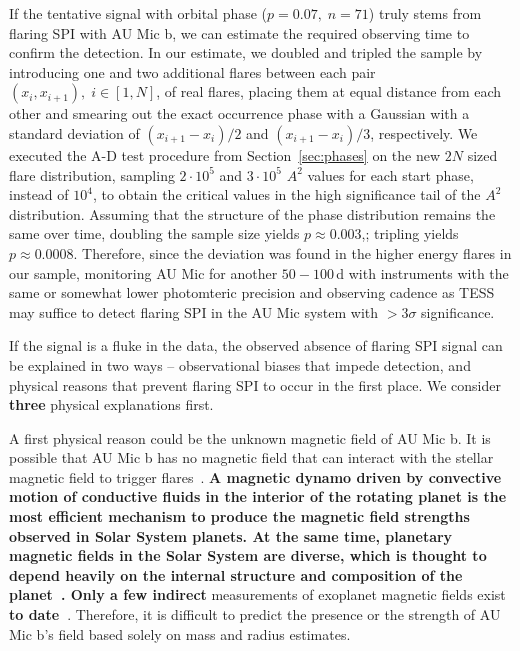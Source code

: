 \documentclass[fleqn,usenatbib]{mnras}%
\begin{document}
If the tentative signal with orbital phase \mbox{($p=0.07,\;n=71$)} truly stems from flaring SPI with AU Mic b, we can estimate the required observing time to confirm the detection. In our estimate, we doubled and tripled the sample by introducing one and two additional flares between each pair $(x_i,x_{i+1}),\;i \in [1,N]$, of real flares, placing them at equal distance from each other and smearing out the exact occurrence phase with a Gaussian with a standard deviation of $(x_{i+1}-x_i)/2$ and $(x_{i+1}-x_i)/3$, respectively. We executed the A-D test procedure from Section~\ref{sec:phases} on the new $2N$ sized flare distribution, sampling $2\cdot 10^5$ and $3\cdot 10^5$ $A^2$ values for each start phase, instead of $10^4$, to obtain the critical values in the high significance tail of the $A^2$ distribution. Assuming that the structure of the phase distribution remains the same over time, doubling the sample size yields $p\approx 0.003$,; tripling yields $p\approx0.0008$. Therefore, since the deviation was found in the higher energy flares in our sample, monitoring AU Mic for another $50-100\,$d with instruments with the same or somewhat lower photomteric precision and observing cadence as TESS may suffice to detect flaring SPI in the AU Mic system with $>3\sigma$ significance.

If the signal is a fluke in the data, the observed absence of flaring SPI signal can be explained in two ways -- observational biases that impede detection, and physical reasons that prevent flaring SPI to occur in the first place. We consider \textbf{three} physical explanations first.

A first physical reason could be the unknown magnetic field of AU Mic b. It is possible that AU Mic b has no magnetic field that can interact with the stellar magnetic field to trigger flares~\citep{lanza2018close-by}. \textbf{A magnetic dynamo driven by convective motion of conductive fluids in the interior of the rotating planet is the most efficient mechanism to produce the magnetic field strengths observed in Solar System planets. At the same time, planetary magnetic fields in the Solar System are diverse, which is thought to depend heavily on the internal structure and composition of the planet~\citep{stevenson2003planetary, jones2011planetary}. Only a few indirect} measurements of exoplanet magnetic fields exist \textbf{to date~\citep[e.g.][]{cauley2019magnetic, ben-jaffel2021signatures}}. Therefore, it is difficult to predict the presence or the strength of AU Mic b's field based solely on mass and radius estimates.
\end{document}
